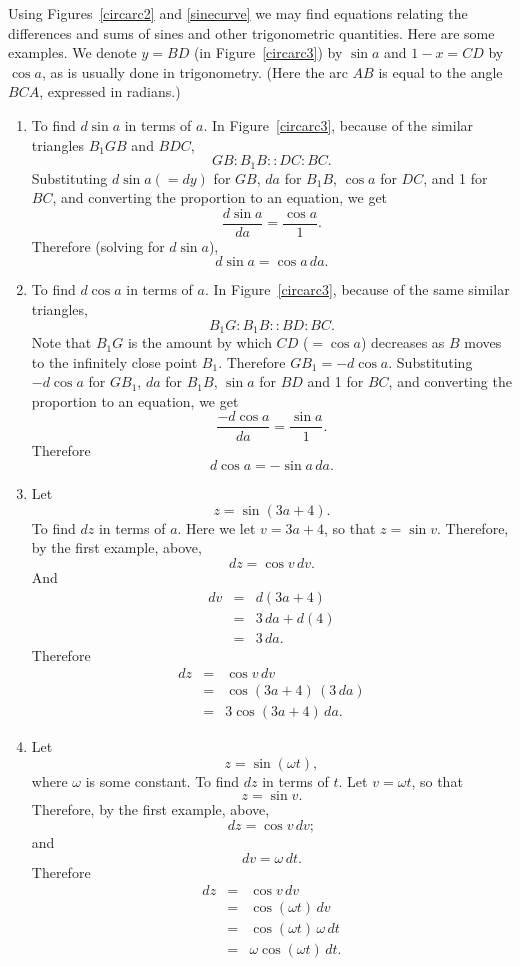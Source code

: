 \documentclass[polutonikogreek,english,twoside,openright]{article}
\begin{document}
Using Figures~\ref{circarc2} and \ref{sinecurve}
we may find equations relating the differences and sums of sines and other trigonometric quantities.  Here are some examples.  We denote $y=BD$ (in Figure~\ref{circarc3}) by $\sin a$ and $1-x = CD$ by $\cos a$, as is usually done in trigonometry.  (Here the arc $AB$ is equal to the angle $BCA$, expressed in radians.)
\begin{enumerate}

\item \label{dsin}To find $d\sin a$ in terms of $a$.  In Figure~\ref{circarc3}, because of the similar triangles $B_1GB$ and $BDC$,
$$ GB \!:\! B_1B::  DC \!:\! BC.$$
Substituting $d\sin a (=dy)$ for $GB$, $da$ for $B_1B$, $\cos a$ for $DC$, and 1 for $BC$, and converting the proportion to an equation, we get
$$\frac{d\sin a}{da} = \frac{\cos a}{1}.$$
Therefore (solving for $d\sin a$), 
$$d\sin a = \cos a\,da.$$

\item To find $d\cos a$ in terms of $a$.  In Figure~\ref{circarc3}, because of the same similar triangles,
$$B_1G \!:\! B_1B :: BD \!:\! BC.$$
Note that $B_1G$ is the amount by which  $CD$ ($= \cos a$) decreases as $B$ moves to the infinitely close point $B_1$.  Therefore $GB_1 = -d\cos a$.  Substituting $-d\cos a$ for $GB_1$, $da$ for $B_1B$, $\sin a$ for $BD$ and 1 for $BC$, and converting the proportion to an equation, we get
$$\frac{-d\cos a}{da} = \frac{\sin a}{1}.$$
Therefore
$$d\cos a = -\sin a\,da.$$

\item \label{trigex3} Let
$$z = \sin(3a+ 4).$$
To find $dz$ in terms of $a$.  Here we let $v= 3a+4$, so that $z = \sin v$.
Therefore, by the first example, above,
$$dz = \cos v\,dv.$$
And
\setlength{\jot}{1.5ex}
\begin{eqnarray*}
dv & = & d(3a+4)\\
& = & 3\,da + d(4) \\
& = & 3\,da.
\end{eqnarray*}
Therefore 
\begin{eqnarray*}
dz & = & \cos v \,dv\\
& = & \cos (3a + 4) \,(3\,da)\\
& =& 3\cos (3a+4) \,da.
\end{eqnarray*}

\item Let 
$$z = \sin(\omega t),$$
where $\omega$ is some constant.  To find $dz$ in terms of $t$.  Let $v = \omega t$, so that 
$$z = \sin v.$$
Therefore, by the first example, above,
$$dz = \cos v\,dv;$$
and
$$dv = \omega\,dt.$$
Therefore
\begin{eqnarray*}
dz & = & \cos v\,dv\\
& = & \cos (\omega t)\,dv\\
& = & \cos(\omega t)\,\omega\,dt\\
& = & \omega \cos(\omega t)\,dt.
\end{eqnarray*}



\end{enumerate}
\end{document}
